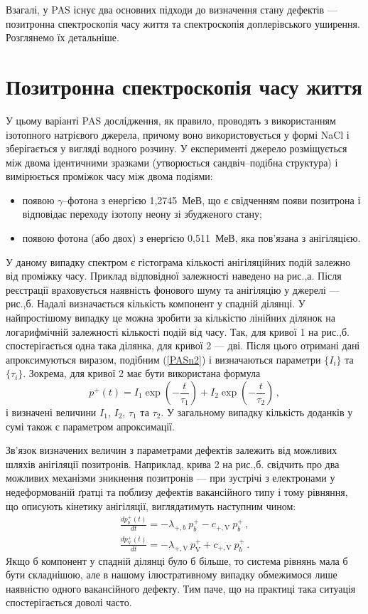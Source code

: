 \documentclass[10pt,a5paper,titlepage,oneside]{book}
\numberwithin{equation}{part}
\begin{document}
Взагалі, у PAS існує два основних підходи до визначення стану дефектів ---позитронна спектроскопія часу життя
та спектроскопія доплерівського уширення.
Розглянемо їх детальніше.

\section{Позитронна спектроскопія часу життя}\label{secPAS_PSLT}
У цьому варіанті PAS дослідження, як правило, проводять з використанням ізотопного натрієвого джерела,
причому воно використовується у формі NaCl і зберігається у вигляді водного розчину.
У експерименті джерело розміщується між двома ідентичними зразками
(утворюється сандвіч--подібна структура) і
вимірюється проміжок часу між двома подіями:
\begin{itemize}[leftmargin=0em,itemindent=1.5em]
\item появою $\gamma$--фотона з енергією 1,2745~МеВ, що є свідченням появи позитрона і відповідає переходу ізотопу неону зі збудженого стану;
\item появою фотона (або двох) з енергією 0,511~МеВ, яка пов'язана з анігіляцією.
\end{itemize}
У даному випадку спектром є гістограма кількості анігіляційних подій залежно від проміжку часу.
Приклад відповідної залежності наведено на рис.,а.
Після реєстрації враховується наявність фонового шуму та анігіляцію у джерелі --- рис.,б.
Надалі визначається кількість компонент у спадній ділянці.
У найпростішому випадку це можна зробити за кількістю лінійних ділянок на логарифмічній залежності
кількості подій від часу.
Так, для кривої 1 на рис.,б. спостерігається одна така ділянка,
для кривої 2 --- дві.
Після цього отримані дані апроксимуються виразом, подібним (\ref{PASn2}) і визначаються параметри $\{I_i\}$ та $\{\tau_i\}$.
Зокрема, для кривої 2 має бути використана формула
\begin{equation*}
p^+(t)=I_1\exp\left(-\frac{t}{\tau_1}\right)+I_2\exp\left(-\frac{t}{\tau_2}\right)\,,
\end{equation*}
і визначені величини $I_1$, $I_2$, $\tau_1$ та $\tau_2$.
У загальному випадку кількість доданків у сумі також є параметром апроксимації.

Зв'язок визначених величин з параметрами дефектів залежить від можливих шляхів анігіляції позитронів.
Наприклад, крива 2 на рис.,б. свідчить про два можливих механізми зникнення позитронів --- при зустрічі з електронами
у недеформованій ґратці та поблизу дефектів вакансійного типу і
тому рівняння, що описують кінетику анігіляції, виглядатимуть наступним чином:
\begin{gather}
 \frac{dp_{b}^+(t)}{dt}= -\lambda_{+,b}\:p_{b}^+ - c_{+,\mathrm{V}} \:p_{b}^+ \,, \label{PASnb1}\\
\frac{dp_{\mathrm{V}}^+(t)}{dt}= - \lambda_{+,\mathrm{V}}\,p_{\mathrm{V}}^+ + c_{+,\mathrm{V}} \:p_{b}^+ \,.\label{PASnv1}
\end{gather}
Якщо б компонент у спадній ділянці було б більше, то система рівнянь мала б бути складнішою,
але в нашому ілюстративному випадку обмежимося лише наявністю одного вакансійного дефекту.
Тим паче, що на практиці така ситуація спостерігається доволі часто.
\end{document}
